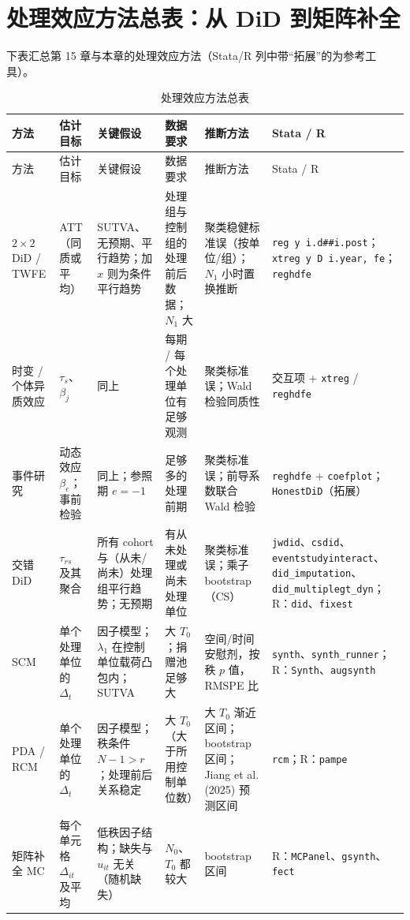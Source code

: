 \section{处理效应方法总表：从 DiD 到矩阵补全}\label{sec:U16-table}

下表汇总第 15 章与本章的处理效应方法（Stata/R 列中带“拓展”的为参考工具）。

{\footnotesize
\setlength{\tabcolsep}{4pt}
\renewcommand{\arraystretch}{1.3}
\begin{longtable}{>{\raggedright\arraybackslash}p{1.4cm}>{\raggedright\arraybackslash}p{2.0cm}>{\raggedright\arraybackslash}p{3.1cm}>{\raggedright\arraybackslash}p{2.4cm}>{\raggedright\arraybackslash}p{2.7cm}>{\raggedright\arraybackslash}p{3.0cm}}
\caption{处理效应方法总表}\label{tab:U16-all}\\
\toprule
方法 & 估计目标 & 关键假设 & 数据要求 & 推断方法 & Stata / R\\
\midrule
\endfirsthead
\toprule
方法 & 估计目标 & 关键假设 & 数据要求 & 推断方法 & Stata / R\\
\midrule
\endhead
\bottomrule
\endlastfoot
$2\times2$ DiD / TWFE & ATT（同质或平均） & SUTVA、无预期、平行趋势；加 $x$ 则为条件平行趋势 & 处理组与控制组的处理前后数据；$N_1$ 大 & 聚类稳健标准误（按单位/组）；$N_1$ 小时置换推断 & \texttt{reg y i.d\#\#i.post}；\texttt{xtreg y D i.year, fe}；\texttt{reghdfe}\\
时变 / 个体异质效应 & $\tau_s$、$\beta_j$ & 同上 & 每期 / 每个处理单位有足够观测 & 聚类标准误；Wald 检验同质性 & 交互项 + \texttt{xtreg} / \texttt{reghdfe}\\
事件研究 & 动态效应 $\beta_e$；事前检验 & 同上；参照期 $e=-1$ & 足够多的处理前期 & 聚类标准误；前导系数联合 Wald 检验 & \texttt{reghdfe} + \texttt{coefplot}；\texttt{HonestDiD}（拓展）\\
交错 DiD & $\tau_{rs}$ 及其聚合 & 所有 cohort 与（从未/尚未）处理组平行趋势；无预期 & 有从未处理或尚未处理单位 & 聚类标准误；乘子 bootstrap（CS） & \texttt{jwdid}、\texttt{csdid}、\texttt{eventstudyinteract}、\texttt{did\_imputation}、\texttt{did\_multiplegt\_dyn}；R：\texttt{did}、\texttt{fixest}\\
SCM & 单个处理单位的 $\Delta_t$ & 因子模型；$\lambda_1$ 在控制单位载荷凸包内；SUTVA & 大 $T_0$；捐赠池足够大 & 空间/时间安慰剂，按秩 $p$ 值，RMSPE 比 & \texttt{synth}、\texttt{synth\_runner}；R：\texttt{Synth}、\texttt{augsynth}\\
PDA / RCM & 单个处理单位的 $\Delta_t$ & 因子模型；秩条件 $N-1>r$；处理前后关系稳定 & 大 $T_0$（大于所用控制单位数） & 大 $T_0$ 渐近区间；bootstrap 区间；Jiang et al. (2025) 预测区间 & \texttt{rcm}；R：\texttt{pampe}\\
矩阵补全 MC & 每个单元格 $\Delta_{it}$ 及平均 & 低秩因子结构；缺失与 $u_{it}$ 无关（随机缺失） & $N_0$、$T_0$ 都较大 & bootstrap 区间 & R：\texttt{MCPanel}、\texttt{gsynth}、\texttt{fect}\\
\end{longtable}
}

